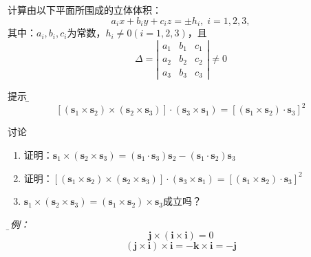 \begin{frame}
	\linespread{1.2}
	\;计算由以下平面所围成的立体体积：
	$$a_ix+b_iy+c_iz=\pm h_i,\;i=1,2,3,$$
	其中：$a_i,b_i,c_i$为常数，$h_i\ne0(i=1,2,3)$，且
	$$\Delta=\left|\begin{array}{ccc}
	a_1 & b_1 & c_1\\ a_2 & b_2 & c_2 \\ a_3 & b_3 & c_3
	\end{array}\right|\ne 0$$
	
	\pause\alert{提示：}\b
	$$\left[(\bm{s}_1\times\bm{s}_2)\times
	(\bm{s}_2\times\bm{s}_3)\right]\cdot(\bm{s}_3\times\bm{s}_1)=
	\left[(\bm{s}_1\times\bm{s}_2)\cdot\bm{s}_3\right]^2$$ 
\end{frame}

\begin{frame}{讨论}
	\linespread{1.2}
	\begin{enumerate}
	  \item 证明：$\bm{s}_1\times(\bm{s}_2\times\bm{s}_3)
	  	=(\bm{s}_1\cdot\bm{s}_3)\bm{s}_2
		-(\bm{s}_1\cdot\bm{s}_2)\bm{s}_3$\pause
	  \item 证明：$\left[(\bm{s}_1\times\bm{s}_2)\times
	  	(\bm{s}_2\times\bm{s}_3)\right]
		\cdot(\bm{s}_3\times\bm{s}_1)
		=\left[(\bm{s}_1\times\bm{s}_2)\cdot\bm{s}_3\right]^2$\pause
	  \item $\bm{s}_1\times(\bm{s}_2\times\bm{s}_3)
	  =(\bm{s}_1\times\bm{s}_2)\times\bm{s}_3$成立吗？
	\end{enumerate}
	\it\b 反例：
	$$\bm{j}\times(\bm{i}\times\bm{i})=0$$
	$$(\bm{j}\times\bm{i})\times\bm{i}=-\bm{k}\times\bm{i}=-\bm{j}$$
\end{frame}